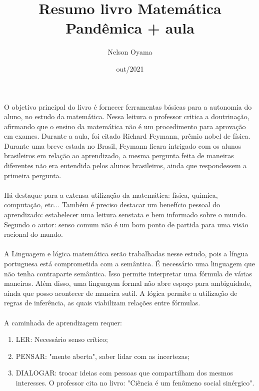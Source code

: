 \documentclass[a4paper]{article}
\author{Nelson Oyama}
\title{Resumo livro Matemática Pandêmica + aula}
\date{out/2021}
\begin{document}
	\maketitle
	\paragraph{}O objetivo principal do livro é fornecer ferramentas básicas para a autonomia do aluno, no estudo da matemática.
	Nessa leitura o professor critica a doutrinação, afirmando que o ensino da matemática não é um procedimento para aprovação em exames. Durante a aula, foi citado Richard Feymann, prêmio nobel de física. Durante uma breve estada no Brasil, Feymann ficara intrigado com os alunos brasileiros em relação ao aprendizado, a mesma pergunta feita de maneiras diferentes não era entendida pelos alunos brasileiros, ainda que respondessem a primeira pergunta.
	\paragraph{}Há destaque para a extensa utilização da matemática: física, química, computação, etc... Também é preciso destacar um benefício pessoal do aprendizado: estabelecer uma leitura senstata e bem informado sobre o mundo. Segundo o autor: senso comum não é um bom ponto de partida para uma visão racional do mundo.
	\paragraph{}A Linguagem e lógica matemática serão trabalhadas nesse estudo, pois a língua portuguesa está comprometida com a semântica. É necessário uma linguagem que não tenha contraparte semântica. Isso permite interpretar uma fórmula de várias maneiras. Além disso, uma linguagem formal não abre espaço para ambiguidade, ainda que posso acontecer de maneira sutil. A lógica permite a utilização de regras de inferência, as quais viabilizam relações entre fórmulas.
	\paragraph{}A caminhada de aprendizagem requer:
	\begin{enumerate}
		\item LER: Necessário senso crítico;
		\item PENSAR: "mente aberta", saber lidar com as incertezas;
		\item DIALOGAR: trocar ideias com pessoas que compartilham dos mesmos interesses. O professor cita no livro: "Ciência é um fenômeno social sinérgico".
	\end{enumerate}
	
\end{document}
